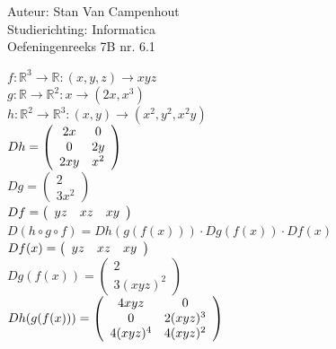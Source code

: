 \documentclass[a4paper]{article}
\begin{document}
  
\noindent \large Auteur: Stan Van Campenhout \\
\noindent \large Studierichting:  Informatica\\
\noindent \large Oefeningenreeks 7B nr. 6.1\\

\medskip

\normalsize

$ f : \mathbb{R}^3 \rightarrow \mathbb{R} : (x,y,z) \rightarrow xyz $\\

$ g : \mathbb{R} \rightarrow \mathbb{R}^2 : x \rightarrow \left(2x, x^3\right) $\\

$ h : \mathbb{R}^2 \rightarrow \mathbb{R}^3 : (x,y) \rightarrow \left(x^2, y^2, x^2y\right) $\\

$ Dh = \left(\begin{array}{c c} 2x & 0 \\ 0 & 2y \\ 2xy & x^2 \end{array} \right) $\\

$ Dg = \left(\begin{array}{c} 2 \\ 3x^2 \end{array}\right) $\\

$ Df = \left(\begin{array}{c c c} yz & xz & xy \end{array}\right) $\\

$ D(h \circ g \circ f) = Dh(g(f(x))) \cdot Dg(f(x)) \cdot Df(x) $\\

$ Df(x) = \left(\begin{array}{c c c} yz & xz & xy \end{array}\right) $\\

$ Dg(f(x)) = \left(\begin{array}{c} 2 \\ 3(xyz)^2 \end{array}\right) $\\

$ Dh(g(f(x))) = \left(\begin{array}{c c} 4xyz & 0 \\ 0 & 2(xyz)^3 \\ 4(xyz)^4 & 4(xyz)^2 \end{array} \right) $\\
\end{document}
